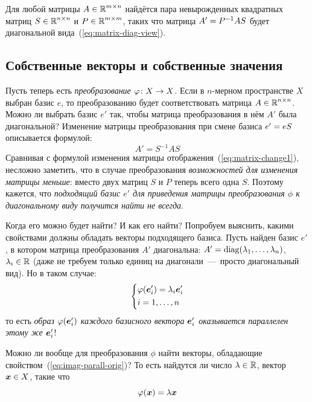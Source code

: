 \documentclass[a4paper,12pt]{article}
\begin{document}
  \begin{theorem}
    Для любой матрицы $A \hm\in \RR^{m \times n}$ найдётся пара невырожденных квадратных матриц $S \hm\in \RR^{n\times n}$ и $P \hm\in \RR^{m\times m}$, таких что матрица $A' \hm= P^{-1} A S$ будет диагональной вида~(\ref{eq:matrix-diag-view}). 
  \end{theorem}
  
  
  \subsection{Собственные векторы и собственные значения}
  
  Пусть теперь есть \emph{преобразование} $\phi\colon X \hm\to X$.
  Если в $n$-мерном пространстве $X$ выбран базис $e$, то преобразованию будет соответствовать матрица $A \hm\in \RR^{n\times n}$.
  Можно ли выбрать базис $e'$ так, чтобы матрица преобразования в нём $A'$ была диагональной?
  Изменение матрицы преобразования при смене базиса $e' \hm= e S$ описывается формулой:
  \begin{equation}\label{eq:matrix-change2}
    A' = S^{-1} A S
  \end{equation}
  Сравнивая с формулой изменения матрицы отображения~(\ref{eq:matrix-change1}), несложно заметить, что в случае преобразования \emph{возможностей для изменения матрицы меньше}: вместо двух матриц $S$ и $P$ теперь всего одна $S$.
  Поэтому кажется, что \emph{подходящий базис $e'$ для приведения матрицы преобразования $\phi$ к диагональному виду получится найти не всегда}.
  
  Когда его можно будет найти?
  И как его найти?
  Попробуем выяснить, какими свойствами должны обладать векторы подходящего базиса.
  Пусть найден базис $e'$, в котором матрица преобразования $A'$ диагональна: $A' \hm= \diag(\lambda_1, \ldots, \lambda_n)$, $\lambda_i \hm\in \RR$ (даже не требуем только единиц на диагонали~---~просто диагональный вид).
  Но в таком случае:
  \begin{equation}\label{eq:imag-parall-orig}
    \left\{
      \begin{aligned}
        &\varphi(\boldsymbol e_i') = \lambda_i \boldsymbol e_i'\\
        &i = 1, \ldots, n
      \end{aligned}
    \right.
  \end{equation}
  то есть \emph{образ $\varphi(\boldsymbol e_i')$ каждого базисного вектора $\boldsymbol e_i'$ оказывается параллелен этому же $\boldsymbol e_i'$}!
  
  Можно ли вообще для преобразования $\phi$ найти векторы, обладающие свойством~(\ref{eq:imag-parall-orig})?
  То есть найдутся ли число $\lambda \in \operatorname{\mathbb R}$, вектор $\boldsymbol x \in X$, такие что
  \begin{equation}\label{eq:eigenvector}
    \varphi(\boldsymbol x) = \lambda \boldsymbol x
  \end{equation}
  
\end{document}
